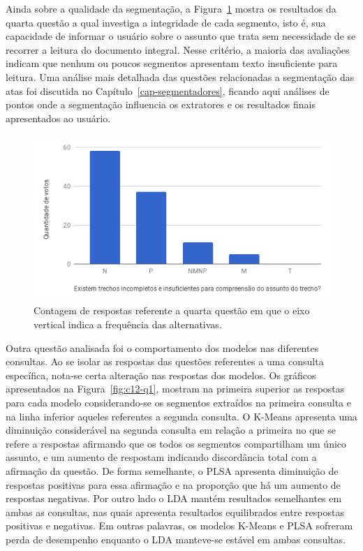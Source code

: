 Ainda sobre a qualidade da segmentação, a Figura~\ref{fig:Q4} mostra os resultados da quarta questão a qual investiga a integridade de cada segmento, isto é, sua capacidade de informar o usuário sobre o assunto que trata sem necessidade de se recorrer a leitura do documento integral. Nesse critério, a maioria das avaliações indicam que nenhum ou poucos segmentos apresentam texto insuficiente para leitura.  Uma análise mais detalhada das questões relacionadas a segmentação das atas foi discutida no Capítulo~\ref{cap-segmentadores}, ficando aqui análises de pontos onde a segmentação influencia os extratores e os resultados finais apresentados ao usuário.


\begin{figure}[!h] \centering     %

		\includegraphics[width=.48\textwidth]{conteudo/capitulos/figs/figuras-experimento/Q4-Seg.png}
	\caption{Contagem de respostas referente a quarta questão em que o eixo vertical indica a frequência das alternativas.  }
	\label{fig:Q4}
\end{figure}


Outra questão analisada foi o comportamento dos modelos nas diferentes consultas. Ao se isolar as respostas das questões referentes a uma consulta específica, nota-se certa alteração nas respostas dos modelos. 
Os gráficos apresentados na Figura~\ref{fig:c12-q1}, mostram na primeira superior as respostas para cada modelo considerando-se os segmentos extraídos na primeira consulta e na linha inferior aqueles referentes a segunda consulta. O K-Means apresenta uma diminuição considerável na segunda consulta em relação a primeira no que se refere a respostas afirmando que os todos os segmentos compartilham um único assunto, e um aumento de respostam indicando discordância total com a afirmação da questão.
De forma semelhante, o PLSA apresenta diminuição de respostas positivas para essa afirmação e na proporção que há um aumento de respostas negativas. 
Por outro lado o LDA mantém resultados semelhantes em ambas as consultas, nas quais apresenta resultados equilibrados entre respostas positivas e negativas. Em outras palavras, os modelos K-Means e PLSA sofreram perda de desempenho enquanto o LDA manteve-se estável em ambas consultas.





